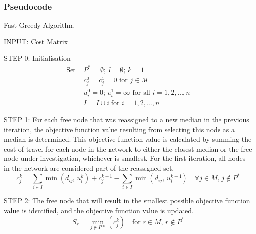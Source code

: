 \documentclass[11pt]{article}
\newcommand{\np}{\newpage}
\begin{document}
	\subsubsection{Pseudocode}
	\begin{algorithm}
		\caption{Fast Greedy Algorithm}
		\begin{algorithmic}[0]
			
			\Statex 
			\Statex INPUT: Cost Matrix
			
			\Statex
			\Statex STEP 0: Initialisation 	
			\begin{align*}
			\text{Set } & P^{*} = \emptyset \text{; } I = \emptyset \text{; } k = 1\\
			& c_j^0=c_j^1 = 0 \text{ for }j\in M\\
			& u_i^0 = 0 \text{; } u_i^1 = \infty\text{ for all } i=1,2,\dots,n\\
			& I=I\cup i \text{ for } i=1,2,\dots,n
			\end{align*}
			\Statex	
			
			\Statex
			\Statex STEP 1: For each free node that was reassigned to a new median in the previous iteration, the objective function value resulting from selecting this node as a median is determined.  This objective function value is calculated by summing the cost of travel for each node in the network to either the closest median or the free node under investigation, whichever is smallest.  For the first iteration, all nodes in the network are considered part of the reassigned set.
			\begin{equation*}
			c_j^k = \sum_{i\in I}\min(d_{ij} \text{, } u_i^k) + c_j^{k-1} - \sum_{i\in I}\min(d_{ij} \text{, } u_i^{k-1})\quad \forall j \in M \text{, } j \notin P^*
			\end{equation*}
			
			
			\Statex
			\Statex STEP 2: The free node that will result in the smallest possible objective function value is identified, and the objective function value is updated.
			\begin{equation*}
			S_r = \min_{j \notin P*}(c_j^k) \quad \text{for } r \in M \text{, } r \notin P^*
			\end{equation*}
			
		\end{algorithmic}
	\end{algorithm}
	
\np
	
\end{document}
